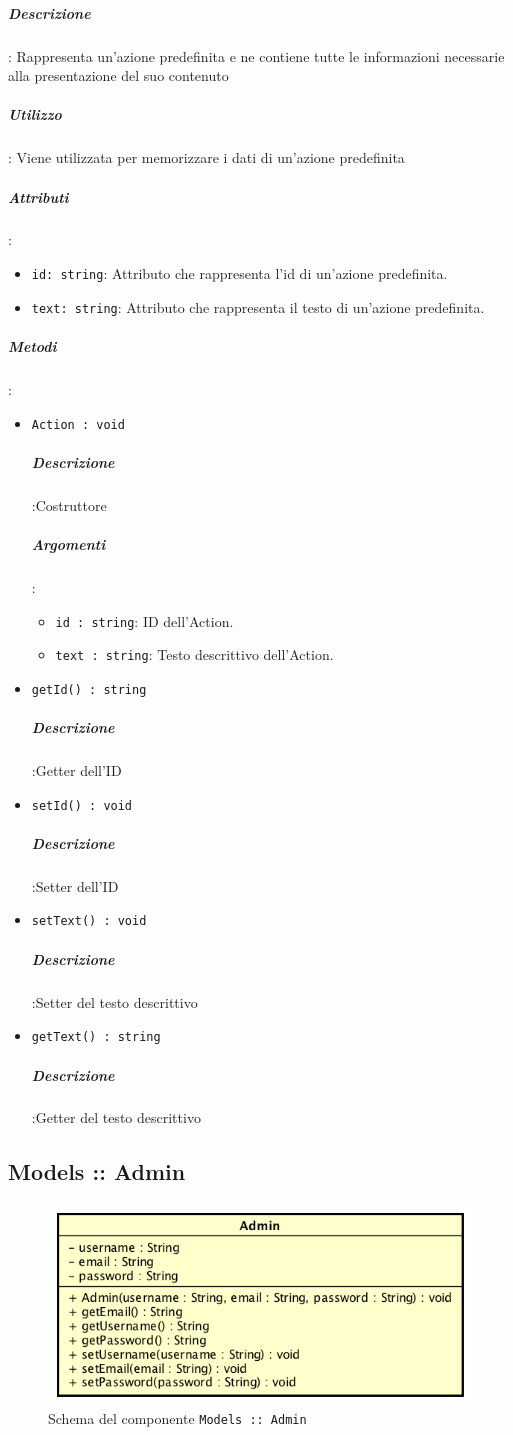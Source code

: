 \documentclass[../ManualeSviluppatore_v1.0.0.tex]{subfiles}
\begin{document}
		\subparagraph{Descrizione}: Rappresenta un'azione predefinita e ne contiene tutte le informazioni necessarie alla presentazione del suo contenuto
		\subparagraph{Utilizzo}: Viene utilizzata per memorizzare i dati di un'azione predefinita
		\subparagraph{Attributi}:
		      \begin{itemize}
		      	\item \texttt{id: string}:
		      	      Attributo che rappresenta l'id di un'azione predefinita.
		      	\item \texttt{text: string}:
		      	      Attributo che rappresenta il testo di un'azione predefinita.
		      \end{itemize}
		\subparagraph{Metodi}:
		      \begin{itemize}
		      	\item \texttt{Action : void}
		      	      \subparagraph{Descrizione}:Costruttore
					\subparagraph{Argomenti}:
						\begin{itemize}
							\item \texttt{id : string}:
								ID dell'Action.
							\item \texttt{text : string}:
								Testo descrittivo dell'Action.
						\end{itemize}

		      	\item \texttt{getId() : string}
		      	      \subparagraph{Descrizione}:Getter dell'ID

		      	\item \texttt{setId() : void}
		      	      \subparagraph{Descrizione}:Setter dell'ID

		      	\item \texttt{setText() : void}
		      	      \subparagraph{Descrizione}:Setter del testo descrittivo

		      	\item \texttt{getText() : string}
		      	      \subparagraph{Descrizione}:Getter del testo descrittivo
		      \end{itemize}



	\newpage
	\subsection{Models :: Admin}
	\begin{figure}[!h]
		\centering
		\includegraphics[scale=0.6]{Architettura/Front-End/Models/Admin.png}
		\caption{Schema del componente \texttt{Models :: Admin}}
	\end{figure}
\end{document}
